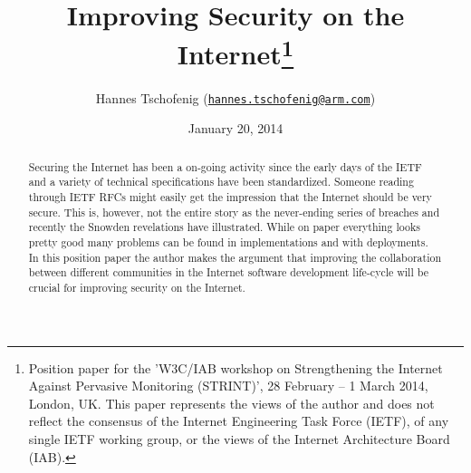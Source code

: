 \documentclass[peerreview, a4paper, 7pt]{IEEEtran}
\title{Improving Security on the Internet\thanks{Position paper for the 'W3C/IAB workshop on Strengthening the Internet Against Pervasive Monitoring (STRINT)', 28 February – 1 March 2014, London, UK. This paper represents the views of the author and does not reflect the consensus of the Internet Engineering Task Force (IETF), of any single IETF working group, or the views of the Internet Architecture Board (IAB).}}
\author{Hannes Tschofenig (\texttt{\href{mailto:hannes.tschofenig@arm.com}{hannes.tschofenig@arm.com}})}
\date{January 20, 2014}
\begin{document}
\maketitle


\begin{abstract}

Securing the Internet has been a on-going activity since the early days of the IETF and a variety of technical specifications have been standardized. 
Someone reading through IETF RFCs might easily get the impression that the Internet should be very secure. This is, however, not the entire story as the never-ending series of breaches and recently the Snowden revelations have illustrated. While on paper everything looks pretty good many problems can be found in implementations and with deployments.\\

In this position paper the author makes the argument that improving the collaboration between different communities in the Internet software development life-cycle will be crucial for improving security on the Internet. 






\end{abstract}
\end{document}
